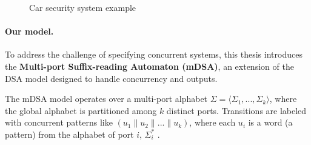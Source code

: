    \begin{figure}
   \centering
   \caption{Car security system example}
   \label{fig:car-example}
   \end{figure}


\paragraph*{Our model.}
To address the challenge of specifying concurrent systems, this thesis introduces the \textbf{Multi-port Suffix-reading Automaton (mDSA)}, an extension of the DSA model designed to handle concurrency and outputs. 

The mDSA model operates over a multi-port alphabet $\Sigma = \langle\Sigma_1, ..., \Sigma_k\rangle$, where the global alphabet is partitioned among $k$ distinct ports. Transitions are labeled with concurrent patterns like $(u_1 \parallel u_2 \parallel ... \parallel u_k)$, where each $u_i$ is a word (a pattern) from the alphabet of port $i$, $\Sigma_i^*$ \cite{Keerthan2025netys}.

